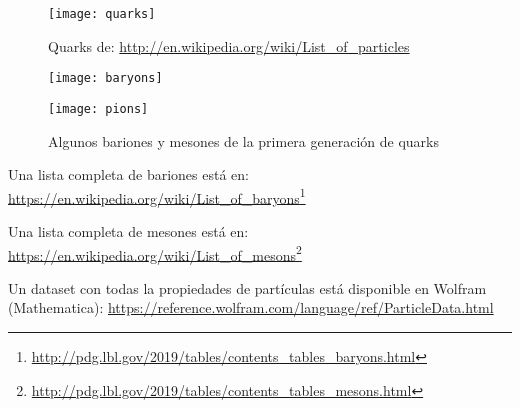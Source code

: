 \begin{frame}
\begin{figure}
  \centering
  \texttt{[image: quarks]}
  \caption{Quarks de: \url{http://en.wikipedia.org/wiki/List_of_particles}}
  \label{tab:quarks}
\end{figure}
\end{frame}
\begin{frame}
\begin{figure}
  \centering
  \texttt{[image: baryons]}
  
  \texttt{[image: pions]}
  \caption{Algunos bariones y mesones de la primera generación de quarks}
  \label{tab:baryonsmesons}
\end{figure}

Una lista completa de bariones está en: \url{https://en.wikipedia.org/wiki/List_of_baryons}\footnote{\url{http://pdg.lbl.gov/2019/tables/contents_tables_baryons.html}}

Una lista completa de mesones está en: \url{https://en.wikipedia.org/wiki/List_of_mesons}\footnote{\url{http://pdg.lbl.gov/2019/tables/contents_tables_mesons.html}}

Un dataset con todas la propiedades de partículas está disponible en Wolfram (Mathematica): \url{https://reference.wolfram.com/language/ref/ParticleData.html}

\end{frame}

